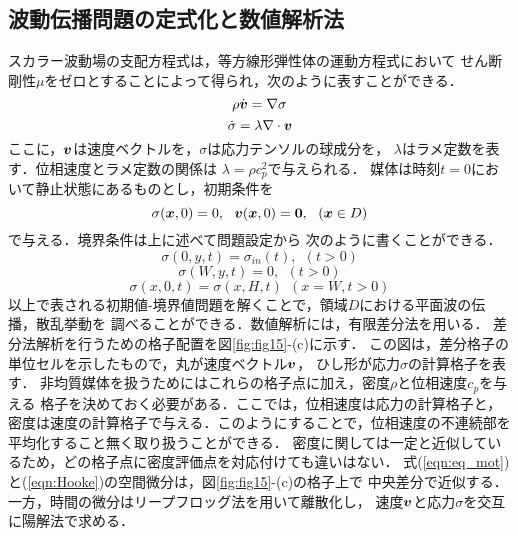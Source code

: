 \subsection{波動伝播問題の定式化と数値解析法}
スカラー波動場の支配方程式は，等方線形弾性体の運動方程式において
せん断剛性$\mu$をゼロとすることによって得られ，次のように表すことができる．
\begin{equation}
	\rho \dot{\fat{v}}=\nabla \sigma
	\label{eqn:eq_mot}
\end{equation}
\begin{equation}
	\dot{\sigma}=\lambda \nabla \cdot \fat{v}
	\label{eqn:Hooke}
\end{equation}
ここに，$\mbox{\boldmath{$v$}}$は速度ベクトルを，$\sigma$は応力テンソルの球成分を，
$\lambda$はラメ定数を表す．位相速度とラメ定数の関係は
$\lambda =\rho c_p^2$で与えられる．
媒体は時刻$t=0$において静止状態にあるものとし，初期条件を
\begin{equation}
	\sigma(\fat{x},0)=0, \ \ \fat{v}(\fat{x},0)=\fat{0}, \ \ (\fat{x} \in D)
	\label{eqn:IC}
\end{equation}
で与える．境界条件は上に述べて問題設定から
次のように書くことができる．
\begin{equation}
	\sigma(0,y,t)=\sigma_{in}(t), \ \ (t>0)
	\label{eqn:}
\end{equation}
\begin{equation}
	\sigma(W,y,t)=0, \ \ (t>0)
	\label{eqn:}
\end{equation}
\begin{equation}
	\sigma(x,0,t)=\sigma(x,H,t)  \ \ (x=W, t>0)
	\label{eqn:}
\end{equation}
以上で表される初期値-境界値問題を解くことで，領域$D$における平面波の伝播，散乱挙動を
調べることができる．数値解析には，有限差分法を用いる．
差分法解析を行うための格子配置を図\ref{fig:fig15}-(c)に示す．
この図は，差分格子の単位セルを示したもので，丸が速度ベクトル$\mbox{\boldmath{$v$}}$，
ひし形が応力$\sigma$の計算格子を表す．
非均質媒体を扱うためにはこれらの格子点に加え，密度$\rho$と位相速度$c_p$を与える
格子を決めておく必要がある．ここでは，位相速度は応力の計算格子と，
密度は速度の計算格子で与える．このようにすることで，位相速度の不連続部を
平均化すること無く取り扱うことができる．
密度に関しては一定と近似しているため，どの格子点に密度評価点を対応付けても違いはない．
式(\ref{eqn:eq_mot})と(\ref{eqn:Hooke})の空間微分は，図\ref{fig:fig15}-(c)の格子上で
中央差分で近似する．一方，時間の微分はリープフロッグ法を用いて離散化し，
速度$\mbox{\boldmath{$v$}}$と応力$\sigma$を交互に陽解法で求める．
